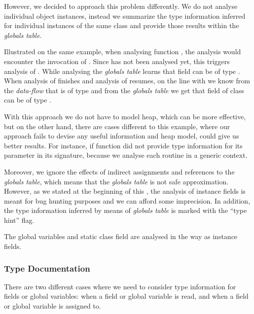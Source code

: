         However, we decided to approach this problem differently. 
        We do not analyse individual object instances, 
        instead we summarize the type information inferred 
        for individual instances of the same class and provide 
        those results within the \emph{globals table}.
        
        Illustrated on the same example, when analysing function 
        , the analysis would encounter the invocation 
        of . Since  has not been analysed yet, 
        this triggers analysis of . While analysing 
         the \emph{globals table} learns that 
        field  can be of type . When analysis 
        of  finishes and analysis of  resumes, 
        on the line with  we know from the 
        \emph{data-flow} that  is of type  and 
        from the \emph{globals table} we get that field  
        of class  can be of type .
        
        With this approach we do not have to model heap, 
        which can be more effective, but on the other hand, 
        there are cases different to this example, where our 
        approach fails to devise any useful information 
        and heap model, could give us 
        better results. For instance, if function  
        did not provide type information for its parameter 
        in its signature, because we analyse each routine 
        in a generic context.
                
        Moreover, we ignore the effects of indirect assignments 
        and references to the \emph{globals table}, which means 
        that the \emph{globals table} is not safe approximation. 
        However, as we stated at the beginning of this \wsection{}, 
        the analysis of instance fields is meant for bug hunting 
        purposes and we can afford some imprecision. In addition, 
        the type information inferred by means of \emph{globals table} 
        is marked with the ``type hint'' flag.
        
        The global variables and static class field are analysed 
        in the way as instance fields.
        
        \subsubsection*{Type Documentation}
        There are two different cases where we need to consider type 
        information for fields or global variables: when a field or global 
        variable is read, and when a field or global variable is assigned to.
        
